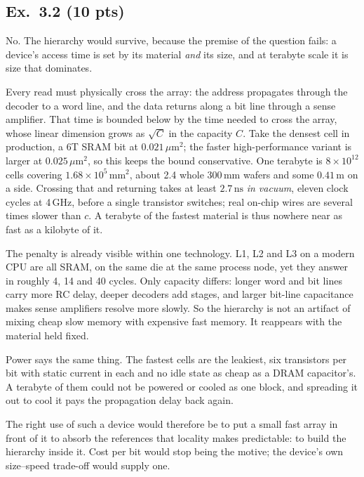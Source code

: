 \subsection*{Ex.~3.2 (10 pts)}

No. The hierarchy would survive, because the premise of the question fails: a
device's access time is set by its material \emph{and} its size, and at terabyte
scale it is size that dominates.

Every read must physically cross the array: the address propagates through the
decoder to a word line, and the data returns along a bit line through a sense
amplifier. That time is bounded below by the time needed to cross the array, whose
linear dimension grows as $\sqrt{C}$ in the capacity $C$. Take the densest cell in
production, a 6T SRAM bit at $0.021\,\mu\mathrm{m}^2$; the faster high-performance
variant is larger at $0.025\,\mu\mathrm{m}^2$, so this keeps the bound conservative.
One terabyte is $8\times10^{12}$ cells covering $1.68\times10^{5}\,\mathrm{mm}^2$,
about 2.4 whole 300\,mm wafers and some $0.41\,\mathrm{m}$ on a side. Crossing that
and returning takes at least $2.7\,\mathrm{ns}$ \emph{in vacuum}, eleven clock
cycles at 4\,GHz, before a single transistor switches; real on-chip wires are
several times slower than $c$. A terabyte of the fastest material is thus nowhere
near as fast as a kilobyte of it.

The penalty is already visible within one technology. L1, L2 and L3 on a modern CPU
are all SRAM, on the same die at the same process node, yet they answer in roughly
4, 14 and 40 cycles. Only capacity differs: longer word and bit lines carry more RC
delay, deeper decoders add stages, and larger bit-line capacitance makes sense
amplifiers resolve more slowly. So the hierarchy is not an artifact of mixing cheap
slow memory with expensive fast memory. It reappears with the material held fixed.

Power says the same thing. The fastest cells are the leakiest, six transistors per
bit with static current in each and no idle state as cheap as a DRAM capacitor's. A
terabyte of them could not be powered or cooled as one block, and spreading it out
to cool it pays the propagation delay back again.

The right use of such a device would therefore be to put a small fast array in front
of it to absorb the references that locality makes predictable: to build the
hierarchy inside it. Cost per bit would stop being the motive; the device's own
size--speed trade-off would supply one.
